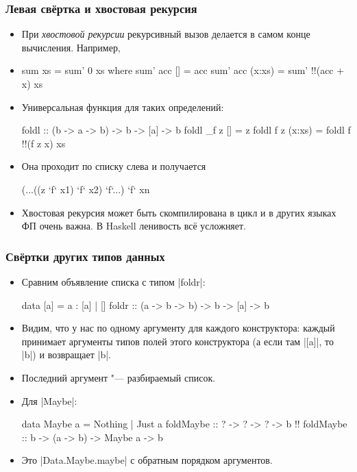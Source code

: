 \documentclass[11pt]{beamer}
\begin{document}
\begin{frame}[fragile]
  \frametitle{Левая свёртка и хвостовая рекурсия}
  \begin{itemize}
    \item При \emph{хвостовой рекурсии} рекурсивный вызов делается в самом конце вычисления. Например,
    \item \begin{haskellsmall}
            sum xs = sum' 0 xs where
              sum' acc [] = acc
              sum' acc (x:xs) = sum' !\pause!(acc + x) xs
          \end{haskellsmall}
    \item Универсальная функция для таких определений:
          \begin{haskellsmall}
            foldl :: (b -> a -> b) -> b -> [a] -> b
            foldl _f z [] = z
            foldl f z (x:xs) = foldl f !\pause!(f z x) xs
          \end{haskellsmall}
    \item Она проходит по списку слева и получается 
          \begin{haskellsmall}
            (...((z `f` x1) `f` x2) `f`...) `f` xn
          \end{haskellsmall}
    \item Хвостовая рекурсия может быть скомпилирована в цикл и в других языках ФП очень важна. В Haskell ленивость всё усложняет.
  \end{itemize}
\end{frame}

\begin{frame}[fragile]
  \frametitle{Свёртки других типов данных}
  \begin{itemize}
    \item Сравним объявление списка с типом \haskinline|foldr|:
          \begin{haskellsmall}
            data [a] = a : [a]       | []
            foldr ::  (a -> b -> b) -> b -> [a] -> b
          \end{haskellsmall}
    \item Видим, что у нас по одному аргументу для каждого конструктора: каждый принимает аргументы типов полей этого конструктора (а если там \haskinline|[a]|, то \haskinline|b|) и возвращает \haskinline|b|.
    \item Последний аргумент "--- разбираемый список.
    \item Для \haskinline|Maybe|:
          \begin{haskellsmall}
            data Maybe a = Nothing | Just a
            foldMaybe ::   ?      -> ?        -> ?       -> b !\pause!
            foldMaybe ::   b      -> (a -> b) -> Maybe a -> b
          \end{haskellsmall}
          \pause
    \item Это \haskinline|Data.Maybe.maybe| с обратным порядком аргументов.
  \end{itemize}
\end{frame}
\end{document}
